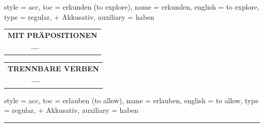 \begin{verbentry}{
  style = {acc},
  toc = {erkunden (to explore)},
  name = {erkunden},
  english = {to explore},
  type = {regular, + Akkusativ},
  auxiliary = {haben}
}
\vspace{10pt}

\begin{tabular}{lll}
\multicolumn{3}{l}{\textbf{MIT PRÄPOSITIONEN}}\\
& \textbf{---} & \\
\end{tabular}
\hfill
\begin{tabular}{lll}
\multicolumn{3}{l}{\textbf{TRENNBARE VERBEN}}\\
& \textbf{---} & \\
\end{tabular}

\vspace{-5pt}
\end{verbentry}

\begin{verbentry}{
  style = {acc},
  toc = {erlauben (to allow)},
  name = {erlauben},
  english = {to allow},
  type = {regular, + Akkusativ},
  auxiliary = {haben}
}
 
    
     \vspace{5pt}

    \hrule
    
    \vspace{5pt}


\end{verbentry}
